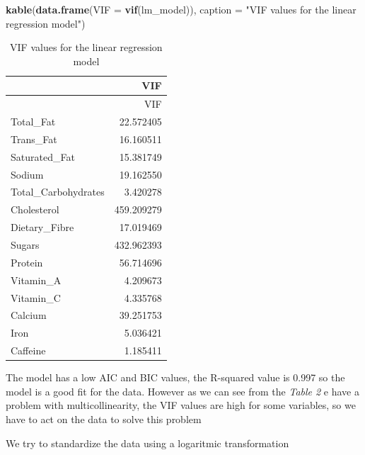 \documentclass[
]{article}
\newenvironment{Shaded}{\begin{snugshade}}{\end{snugshade}}
\newcommand{\AttributeTok}[1]{\textcolor[rgb]{0.13,0.29,0.53}{#1}}
\newcommand{\FunctionTok}[1]{\textcolor[rgb]{0.13,0.29,0.53}{\textbf{#1}}}
\newcommand{\NormalTok}[1]{#1}
\newcommand{\StringTok}[1]{\textcolor[rgb]{0.31,0.60,0.02}{#1}}
\begin{document}
\begin{Shaded}
\begin{Highlighting}[]
\FunctionTok{kable}\NormalTok{(}\FunctionTok{data.frame}\NormalTok{(}\AttributeTok{VIF =} \FunctionTok{vif}\NormalTok{(lm\_model)),}
      \AttributeTok{caption =} \StringTok{"VIF values for the linear regression model"}\NormalTok{)}
\end{Highlighting}
\end{Shaded}

\begin{longtable}[]{@{}lr@{}}
\caption{VIF values for the linear regression model}\tabularnewline
\toprule\noalign{}
& VIF \\
\midrule\noalign{}
\endfirsthead
\toprule\noalign{}
& VIF \\
\midrule\noalign{}
\endhead
\bottomrule\noalign{}
\endlastfoot
Total\_Fat & 22.572405 \\
Trans\_Fat & 16.160511 \\
Saturated\_Fat & 15.381749 \\
Sodium & 19.162550 \\
Total\_Carbohydrates & 3.420278 \\
Cholesterol & 459.209279 \\
Dietary\_Fibre & 17.019469 \\
Sugars & 432.962393 \\
Protein & 56.714696 \\
Vitamin\_A & 4.209673 \\
Vitamin\_C & 4.335768 \\
Calcium & 39.251753 \\
Iron & 5.036421 \\
Caffeine & 1.185411 \\
\end{longtable}

The model has a low AIC and BIC values, the R-squared value is 0.997 so
the model is a good fit for the data. However as we can see from the
\emph{Table 2} e have a problem with multicollinearity, the VIF values
are high for some variables, so we have to act on the data to solve this
problem

We try to standardize the data using a logaritmic transformation
\end{document}
